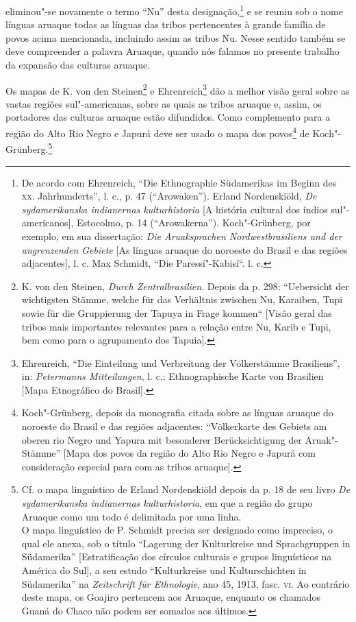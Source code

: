 eliminou"-se novamente o termo ``Nu'' desta designação,\footnote{De acordo
  com Ehrenreich, ``Die Ethnographie Südamerikas im Beginn des \textsc{xx}.
  Jahrhunderts'', l. c., p. 47 (``Arowaken''). Erland Nordenskiöld,
  \emph{De sydamerikanska indianernas kulturhistoria} {[}A história
  cultural dos índios sul"-americanos{]}, Estocolmo, p. 14
  (``Arowakerna''). Koch"-Grünberg, por exemplo, em sua dissertação:
  \emph{Die Aruaksprachen Nordwestbrasiliens und der angrenzenden
  Gebiete} {[}As línguas aruaque do noroeste do Brasil e das regiões
  adjacentes{]}, l. c. Max Schmidt, ``Die Paressí"-Kabisí``. l. c.} e se
reuniu sob o nome línguas aruaque todas as línguas das tribos
pertencentes à grande família de povos acima mencionada, incluindo assim
as tribos Nu. Nesse sentido também se deve compreender a palavra
Aruaque, quando nós falamos no presente trabalho da expansão das
culturas aruaque.

Os mapas de K. von den Steinen\footnote{K. von den Steinen, \emph{Durch
  Zentralbrasilien}. Depois da p. 298: ``Uebersicht der wichtigsten
  Stämme, welche für das Verhältnis zwischen Nu, Karaiben, Tupi sowie
  für die Gruppierung der Tapuya in Frage kommen`` {[}Visão geral das
  tribos mais importantes relevantes para a relação entre Nu, Karib e
  Tupi, bem como para o agrupamento dos Tapuia{]}.} e
Ehrenreich\footnote{Ehrenreich, ``Die Einteilung und Verbreitung der
  Völkerstämme Brasiliens'', in: \emph{Petermanns Mitteilungen}, l. c.:
  Ethnographische Karte von Brasilien {[}Mapa Etnográfico do Brasil{]}.}
dão a melhor visão geral sobre as vastas regiões sul"-americanas, sobre
as quais as tribos aruaque e, assim, os portadores das culturas aruaque
estão difundidos. Como complemento para a região do Alto Rio Negro e
Japurá deve ser usado o mapa dos povos\footnote{Koch"-Grünberg, depois da
  monografia citada sobre as línguas aruaque do noroeste do Brasil e das
  regiões adjacentes: ``Völkerkarte des Gebiets am oberen rio Negro und
  Yapura mit besonderer Berücksichtigung der Aruak"-Stämme'' {[}Mapa dos
  povos da região do Alto Rio Negro e Japurá com consideração especial
  para com as tribos aruaque{]}.} de Koch"-Grünberg.\footnote{Cf. o mapa
  linguístico de Erland Nordenskiöld depois da p. 18 de seu livro
  \emph{De sydamerikanska indianernas kulturhistoria}, em que a região
  do grupo Aruaque como um todo é delimitada por uma linha.\\
  O mapa linguístico de P. Schmidt precisa ser designado como impreciso,
  o qual ele anexa, sob o título ``Lagerung der Kulturkreise und
  Sprachgruppen in Südamerika'' {[}Estratificação dos círculos
  culturais e grupos linguísticos na América do Sul{]}, a seu estudo
  ``Kulturkreise und Kulturschichten in Südamerika'' na
  \emph{Zeitschrift für Ethnologie}, ano 45, 1913, fasc. \textsc{vi}. Ao
  contrário deste mapa, os Goajiro pertencem aos Aruaque, enquanto os
  chamados Guaná do Chaco não podem ser somados aos últimos.}

